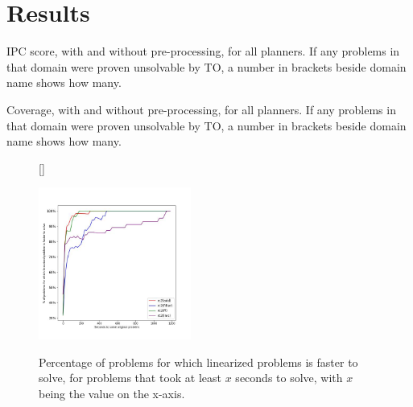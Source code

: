 \section{Results}


\begin{table}[H]
	\setlength{\tabcolsep}{2.5pt} 
	\caption{IPC score, with and without pre-processing, for all planners. If any problems in that domain were proven unsolvable by TO, a number in brackets beside domain name shows how many.} \label{tabIPC} 
	\scalebox{0.8}{ 
		
	}
\end{table}



\begin{table}[H]
	\setlength{\tabcolsep}{2.5pt} 
	\caption{Coverage, with and without pre-processing, for all planners. If any problems in that domain were proven unsolvable by TO, a number in brackets beside domain name shows how many.}\label{tabcoverage} 
	\scalebox{0.8}{ 
		
	}
\end{table}

\begin{figure}
	[\FBwidth]
	{\caption{Percentage of problems for which linearized problems is faster to solve, for problems that took at least $\mathit{x}$ seconds to solve, with $\mathit{x}$  being the value on the x-axis. \\ \label{faster}}}
	{\includegraphics[width=5cm]{figures/faster_to_solve_m.jpg}}
\end{figure}


